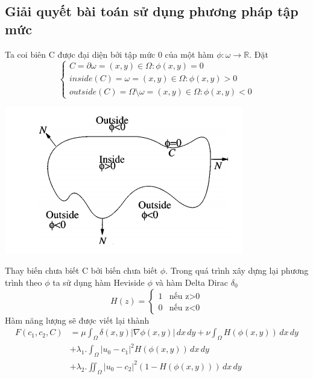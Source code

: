 \documentclass[14pt,oneside,a4paper]{extreport}
\begin{document}
\subsection{Giải quyết bài toán sử dụng phương pháp tập mức}
Ta coi biên C được đại diện bởi tập mức 0 của một hàm $\phi: \omega \rightarrow \mathbb{R}$. Đặt 
\begin{equation*}
\begin{cases}
 C= \partial \omega ={(x,y)\in \Omega: \phi(x,y)=0}\\
 inside(C)= \omega={(x,y)\in \Omega: \phi(x,y)>0}\\
 outside(C)=\Omega \setminus \omega ={(x,y)\in \Omega: \phi(x,y)<0}
   \end{cases}
\end{equation*}
 \begin{center}
\includegraphics[scale=0.6]{figure/insideoutside.png}
\end{center}
Thay biến chưa biết C bởi biến chưa biết $\phi$.  Trong quá trình xây dựng lại phương trình theo $\phi$ ta sử dụng hàm Heviside $\phi$ và hàm Delta Dirac $\delta_0$
 \begin{equation*}
 H(z)=
\begin{cases}
 1 & \text{nếu z>0}\\
0 & \text{nếu z<0}
   \end{cases}
\end{equation*}
Hàm năng lượng sẽ được viết lại thành
\begin{equation*}
\begin{split}
F(c_1, c_2, C)&=\mu \int_{\Omega}\delta(x,y)|\nabla \phi(x,y)|\,dx\,dy+\nu  \int_{\Omega}H( \phi(x,y))\,dx\,dy \\ 
&+\lambda_1 .\int_{\Omega} |u_0-c_1|^2H(\phi(x,y)) \,dx\,dy\\&+\lambda_2 .\iint_{\Omega} |u_0-c_2|^2(1-H(\phi(x,y))) \,dx\,dy
\end{split}
\end{equation*}
\end{document}

